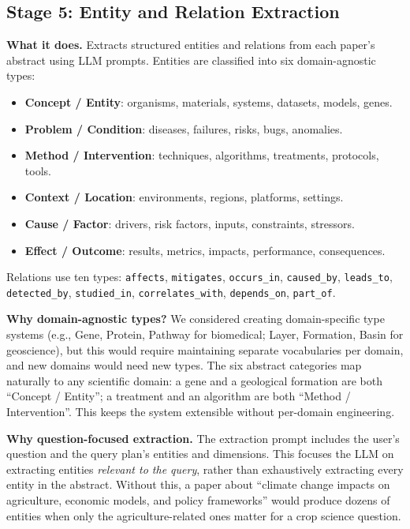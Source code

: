 \documentclass[11pt]{article}
\begin{document}
\subsection{Stage 5: Entity and Relation Extraction}

\textbf{What it does.} Extracts structured entities and relations from each paper's abstract using LLM prompts. Entities are classified into six domain-agnostic types:

\begin{itemize}[leftmargin=1.2em]
  \item \textbf{Concept / Entity}: organisms, materials, systems, datasets, models, genes.
  \item \textbf{Problem / Condition}: diseases, failures, risks, bugs, anomalies.
  \item \textbf{Method / Intervention}: techniques, algorithms, treatments, protocols, tools.
  \item \textbf{Context / Location}: environments, regions, platforms, settings.
  \item \textbf{Cause / Factor}: drivers, risk factors, inputs, constraints, stressors.
  \item \textbf{Effect / Outcome}: results, metrics, impacts, performance, consequences.
\end{itemize}

Relations use ten types: \texttt{affects}, \texttt{mitigates}, \texttt{occurs\_in}, \texttt{caused\_by}, \texttt{leads\_to}, \texttt{detected\_by}, \texttt{studied\_in}, \texttt{correlates\_with}, \texttt{depends\_on}, \texttt{part\_of}.

\textbf{Why domain-agnostic types?} We considered creating domain-specific type systems (e.g., Gene, Protein, Pathway for biomedical; Layer, Formation, Basin for geoscience), but this would require maintaining separate vocabularies per domain, and new domains would need new types. The six abstract categories map naturally to any scientific domain: a gene and a geological formation are both ``Concept / Entity''; a treatment and an algorithm are both ``Method / Intervention''. This keeps the system extensible without per-domain engineering.

\textbf{Why question-focused extraction.} The extraction prompt includes the user's question and the query plan's entities and dimensions. This focuses the LLM on extracting entities \emph{relevant to the query}, rather than exhaustively extracting every entity in the abstract. Without this, a paper about ``climate change impacts on agriculture, economic models, and policy frameworks'' would produce dozens of entities when only the agriculture-related ones matter for a crop science question.
\end{document}
